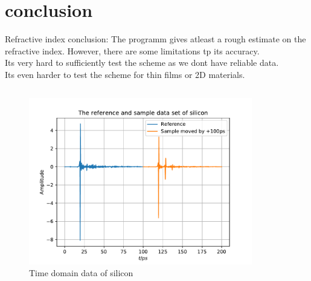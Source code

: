 \documentclass[aspectratio=1610, 9pt]{beamer}
\begin{document}
\section{conclusion}
\begin{frame}{Refractive index}
  \textcolor{tugreen}{conclusion:}
    The programm gives atleast a rough estimate on the refractive index. However, there are some limitations tp its accuracy.\\
    Its very hard to sufficiently test the scheme as we dont have reliable data.\\
    Its even harder to test the scheme for thin films or 2D materials.\\
\end{frame}

\begin{frame}
  \begin{center}
    \begin{columns}
      \begin{column}{0.5\textwidth}
        \begin{figure}
        \includegraphics[width=\textwidth]{silicon/THz_timedomain.pdf}
        \caption{Time domain data of silicon}
        \end{figure}
      \end{column}
      \begin{column}{0.5\textwidth}
        \begin{figure}

\end{figure}
\end{column}
\end{columns}
\end{center}
\end{frame}
\end{document}
